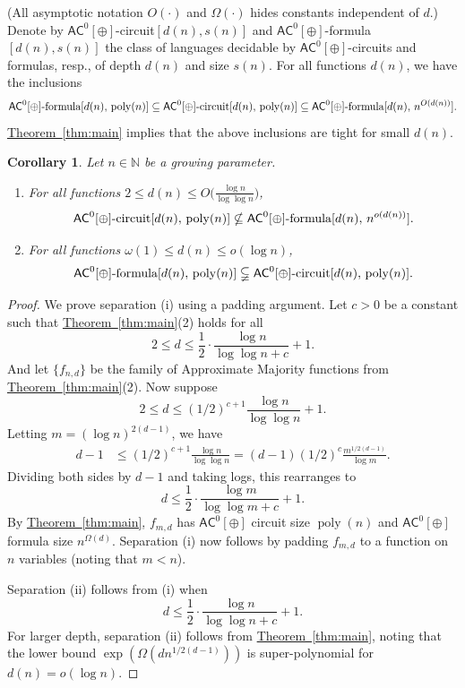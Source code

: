 \documentclass[11pt]{article}
\numberwithin{equation}{section}
\newtheorem{corollary}[theorem]{Corollary}
\theoremstyle{definition}
\theoremstyle{plain}
\newcommand{\cclass}[1]{\textsf{#1}}
\newcommand{\expref}[2]{\hyperref[#2]{#1~\ref{#2}}}
\newcommand{\poly}{\mathop{\mathrm{poly}}}
\newcommand{\AC}{\cclass{AC}}
\begin{document}
(All asymptotic notation $O(\cdot)$ and $\Omega(\cdot)$ hides constants independent of $d$.) 
%
%
%
%
%
Denote by $\AC^0[\oplus]$-circuit$[d(n),s(n)]$
and $\AC^0[\oplus]$-formula$[d(n),s(n)]$
the class of languages decidable by $\AC^0[\oplus]$-circuits
and formulas, resp., of depth $d(n)$ and size $s(n)$.
%
For all functions $d(n)$, we have
%
the inclusions
\[
  \AC^0[\oplus]\textup{-formula}[d(n),\,\mathrm{poly}(n)]
  \subseteq
  \AC^0[\oplus]\textup{-circuit}[d(n),\,\mathrm{poly}(n)]
  \subseteq
  \AC^0[\oplus]\textup{-formula}[d(n),\,n^{O(d(n))}].  
\]
\expref{Theorem}{thm:main} implies that the above
%
inclusions       %
are tight for small $d(n)$.

\begin{corollary}\label{cor:separations}
Let $n \in \mathbb N$ be a growing parameter.
\begin{enumerate}[\normalfont(i)]
\item
For all functions $2 \le d(n) \le O\bigl(\frac{\log n}{\log \log n}\bigr)$, 
\[
  \AC^0[\oplus]\textup{-circuit}[d(n),\,\mathrm{poly}(n)]
  \nsubseteq
%
%
  \AC^0[\oplus]\textup{-formula}[d(n),\,n^{o(d(n))}].   %
\]
\item
For all functions $\omega(1) \le d(n) \le o(\log n)$, 
\[
  \AC^0[\oplus]\textup{-formula}[d(n),\,\mathrm{poly}(n)]
  \subsetneqq
  \AC^0[\oplus]\textup{-circuit}[d(n),\,\mathrm{poly}(n)].
\]
\end{enumerate}
\end{corollary}

\begin{proof}
  We prove separation (i) using a padding argument. Let $c > 0$ be a constant such that \expref{Theorem}{thm:main}(2) holds for all
  \[
    2 \le d \le \frac{1}{2}\cdot \frac{\log n}{\log\log n + c} + 1.
  \]
  And let $\{f_{n,d}\}$ be the family of Approximate Majority
  functions from \expref{Theorem}{thm:main}(2).  Now suppose
  \[
    2 \le d \le (1/2)^{c+1} \frac{\log n}{\log\log n} + 1.
  \]
  Letting $m = (\log n)^{2(d-1)}$, we have
\begin{align*}
  d - 1 &\le (1/2)^{c+1} \frac{\log n}{\log\log n}
  = (d-1) (1/2)^c \frac{m^{1/2(d-1)}}{\log m}.
\end{align*}
Dividing both sides by $d-1$ and taking logs, this rearranges to
\[
  d \le \frac{1}{2}\cdot \frac{\log m}{\log\log m + c} + 1.
\]
By \expref{Theorem}{thm:main}, $f_{m,d}$ has $\AC^0[\oplus]$ circuit size $\poly(n)$ and $\AC^0[\oplus]$ formula size $n^{\Omega(d)}$. Separation (i) now follows by padding $f_{m,d}$ to a function on $n$ variables (noting that $m < n$).

Separation (ii) follows from (i) when
\[
  d \le \frac{1}{2}\cdot \frac{\log n}{\log\log n + c} + 1.
\]
For larger depth, separation (ii) follows from
\expref{Theorem}{thm:main}, noting that the lower bound
$\exp(\Omega(dn^{1/2(d-1)}))$ is super-polynomial for
$d(n) = o(\log n)$.
\end{proof}
\end{document}
